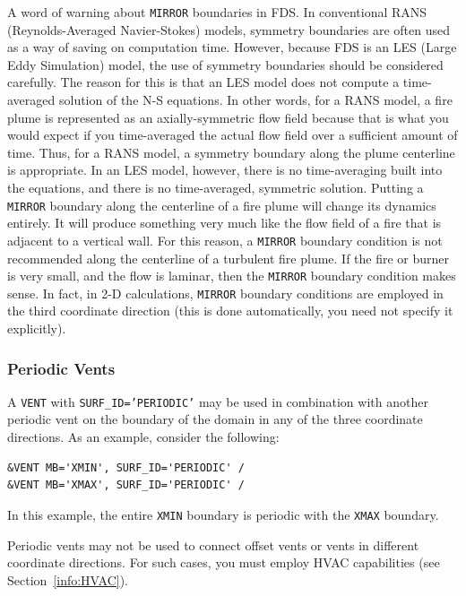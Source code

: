 \documentclass[11pt]{book}
\newcommand{\ct}{\tt\small}
\begin{document}
\noindent
A word of warning about {\ct MIRROR} boundaries in FDS. In conventional RANS (Reynolds-Averaged Navier-Stokes) models, symmetry boundaries are often used as a way of saving on computation time. However, because FDS is an LES (Large Eddy Simulation) model, the use of symmetry boundaries should be considered carefully. The reason for this is that an LES model does not compute a time-averaged solution of the N-S equations. In other words, for a RANS model, a fire plume is represented as an axially-symmetric flow field because that is what you would expect if you time-averaged the actual flow field over a sufficient amount of time. Thus, for a RANS model, a symmetry boundary along the plume centerline is appropriate. In an LES model, however, there is no time-averaging built into the equations, and there is no time-averaged, symmetric solution. Putting a {\ct MIRROR} boundary along the centerline of a fire plume will change its dynamics entirely. It will produce something very much like the flow field of a fire that is adjacent to a vertical wall. For this reason, a {\ct MIRROR} boundary condition is not recommended along the centerline of a turbulent fire plume. If the fire or burner is very small, and the flow is laminar, then the {\ct MIRROR} boundary condition makes sense. In fact, in 2-D calculations, {\ct MIRROR} boundary conditions are employed in the third coordinate direction (this is done automatically, you need not specify it explicitly).

\subsubsection{Periodic Vents}

A {\ct VENT} with {\ct SURF\_ID='PERIODIC'} may be used in combination with another periodic vent on the boundary of the domain in any of the three coordinate directions.  As an example, consider the following:

\footnotesize
\begin{verbatim}
&VENT MB='XMIN', SURF_ID='PERIODIC' /
&VENT MB='XMAX', SURF_ID='PERIODIC' /
\end{verbatim}
\normalsize
In this example, the entire {\ct XMIN} boundary is periodic with the {\ct XMAX} boundary.

Periodic vents may not be used to connect offset vents or vents in different coordinate directions.  For such cases, you must employ HVAC capabilities (see Section~\ref{info:HVAC}).
\end{document}
